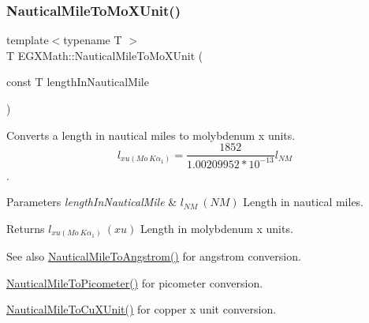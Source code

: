 \subsubsection{\texorpdfstring{Nautical\+Mile\+To\+Mo\+X\+Unit()}{NauticalMileToMoXUnit()}}
{\footnotesize\ttfamily template$<$typename T $>$ \\
T E\+G\+X\+Math\+::\+Nautical\+Mile\+To\+Mo\+X\+Unit (\begin{DoxyParamCaption}\item[{const T}]{length\+In\+Nautical\+Mile }\end{DoxyParamCaption})}



Converts a length in nautical miles to molybdenum x units. \[ l_{xu(Mo\ K\alpha_1)}=\frac{1852}{1.00209952*10^{-13}} l_{NM}\]. 


\begin{DoxyParams}{Parameters}
{\em length\+In\+Nautical\+Mile} & $ l_{NM}\ (NM)$ Length in nautical miles. \\
\hline
\end{DoxyParams}
\begin{DoxyReturn}{Returns}
$ l_{xu(Mo\ K\alpha_1)}\ (xu)$ Length in molybdenum x units. 
\end{DoxyReturn}
\begin{DoxySeeAlso}{See also}
\mbox{\hyperlink{group___e_g_x_math-_conversions-_length_conversions-_non-_s_i-_nautical_mile-_non-_s_i_ga6f451e4456d985c7d63b39a084b3dd23}{Nautical\+Mile\+To\+Angstrom()}} for angstrom conversion. 

\mbox{\hyperlink{group___e_g_x_math-_conversions-_length_conversions-_non-_s_i-_nautical_mile-_s_i_ga5ab6a92054685d45fb032111bcde94e0}{Nautical\+Mile\+To\+Picometer()}} for picometer conversion. 

\mbox{\hyperlink{group___e_g_x_math-_conversions-_length_conversions-_non-_s_i-_nautical_mile-_non-_s_i_gaa0638917756d520cfc0877dcde60d777}{Nautical\+Mile\+To\+Cu\+X\+Unit()}} for copper x unit conversion. 
\end{DoxySeeAlso}
